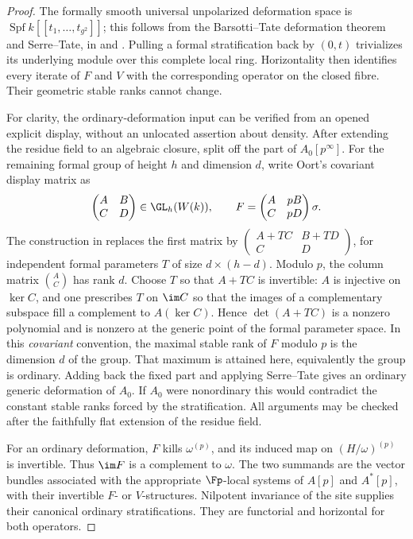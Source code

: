 \begin{proof}
The formally smooth universal unpolarized deformation space is $\operatorname{Spf}k[[t_1,\ldots,t_{g^2}]]$; this follows from the Barsotti--Tate deformation theorem and Serre--Tate, in \cite[Corollary~4.8(i)]{Illusie1985BT} and \cite[Theorem~1.2.1]{Katz1981ST}.  Pulling a formal stratification back by $(0,t)$ trivializes its underlying module over this complete local ring.  Horizontality then identifies every iterate of $F$ and $V$ with the corresponding operator on the closed fibre.  Their geometric stable ranks cannot change.

For clarity, the ordinary-deformation input can be verified from an opened explicit display, without an unlocated assertion about density.  After extending the residue field to an algebraic closure, split off the \etale part of $A_0[p^\infty]$.  For the remaining formal group of height $h$ and dimension $d$, write Oort's covariant display matrix as
\[
 \begin{pmatrix}A&B\\C&D\end{pmatrix}\in\GL_h(W(k)),\qquad
 F=\begin{pmatrix}A&pB\\C&pD\end{pmatrix}\sigma.
\]
The construction in \cite[\S\S1.9, 1.12--1.14]{Oort2000} replaces the first matrix by
$\left(\begin{smallmatrix}A+TC&B+TD\\C&D\end{smallmatrix}\right)$, for independent formal parameters $T$ of size $d\times(h-d)$.  Modulo $p$, the column matrix $\binom A C$ has rank $d$.  Choose $T$ so that $A+TC$ is invertible: $A$ is injective on $\ker C$, and one prescribes $T$ on $\im C$ so that the images of a complementary subspace fill a complement to $A(\ker C)$.  Hence $\det(A+TC)$ is a nonzero polynomial and is nonzero at the generic point of the formal parameter space.  In this \emph{covariant} convention, the maximal stable rank of $F$ modulo $p$ is the dimension $d$ of the group.  That maximum is attained here, equivalently the group is ordinary.  Adding back the fixed \etale part and applying Serre--Tate gives an ordinary generic deformation of $A_0$.  If $A_0$ were nonordinary this would contradict the constant stable ranks forced by the stratification.  All arguments may be checked after the faithfully flat extension of the residue field.

For an ordinary deformation, $F$ kills $\omega^{(p)}$, and its induced map on $(H/\omega)^{(p)}$ is invertible.  Thus $\im F$ is a complement to $\omega$.  The two summands are the vector bundles associated with the appropriate \etale $\Fp$-local systems of $A[p]$ and $A^*[p]$, with their invertible $F$- or $V$-structures.  Nilpotent invariance of the \etale site supplies their canonical ordinary stratifications.  They are functorial and horizontal for both operators.


\end{proof}
